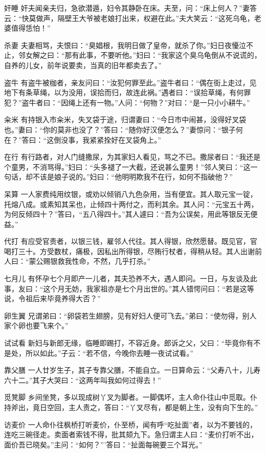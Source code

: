 \documentclass[12pt,UTF8]{ctexbook}
\begin{document}
奸睡
奸夫闻亲夫归，急欲潜遁，妇令其静卧在床。夫至，问：“床上何人？”妻答云：“快莫做声，隔壁王大爷被老娘打出来，权避在此。”夫大笑云：“这死乌龟，老婆值得恁怕！”

杀妻
夫妻相骂，夫恨曰：“臭娼根，我明日做了皇帝，就杀了你。”妇日夜懮泣不止，邻女解之曰：“那有此事，不要听他。”妇曰：“我家这个臭乌龟倒从不说谎的，自养的儿女，前年说要卖，当真的旧年都卖去了。”

盗牛
有盗牛被枷者，亲友问曰：“汝犯何罪至此。”盗牛者曰：“偶在街上走过，见地下有条草绳，以为没用，误拾而归，故连此祸。”遇者曰：“误拾草绳，有何罪犯？”盗牛者曰：“因绳上还有一物。”人问：“何物？”对曰：“是一只小小耕牛。”

籴米
有持银入市籴米，失叉袋于途，归谓妻曰：“今日市中闹甚，没得好叉袋也。”妻曰：“你的莫非也没了？”答曰：“随你好汉便怎么？”妻惊问：“银子何在？”答曰：“这倒没事，我紧紧拴好在叉袋角上。”

在行
有行路者，对人门缝撒尿，为其家妇人看见，骂之不已。撒尿者曰：“我还是个童男，不消骂得。”妇曰：“头多褪了一大截，还说甚么童男！”邻人笑曰：“这一句话，却不该是娘子说的。”妇曰：“他明明欺我不在行，如何不指破他？”

呆算
一人家费纯用纹银，或劝以倾销八九色杂用，当有便宜。其人取元宝一锭，托熔八成。或素知其呆也，止倾四十两付之，而利其余。其人问：“元宝五十两，为何反倾四十？”答曰，“五八得四十。”其人遽曰：“吾为公误矣，用此等银反无便益。”

代打
有应受官责者，以银三钱，雇邻人代往。其人得银，欣然愿替。既见官，官喝打三十。方受数杖，痛极，因私出所得银，尽贿行杖者，得稍从轻。其人出谢前人曰：“蒙公赐银救我性命，不然，几乎打杀。”

七月儿
有怀孕七个月即产一儿者，其夫恐养不大，遇人即问。一日，与友谈及此事，友曰：“这个月无妨，我家祖亦是七个月出世的。”其人错愕问曰：“若是这等说，令祖后来毕竟养得大否？”

卵生翼
兄谓弟曰：“卵袋若生翅膀，见有好妇人便可飞去。”弟曰：“使勿得，别人家个卵也要飞来个。”

试试看
新妇与新郎无缘，临睡即踢打，不容近身。郎诉之父，父曰：“毕竟你有不是处，所以如此。”子云：“若不信，今晚你去睡一夜试试看。”

靠父膳
一人廿岁生子，其子专靠父膳，不能自立。一日算命云：“父寿八十，儿寿六十二。”其子大哭曰：“这两年叫我如何过得去！”

觅凳脚
乡间坐凳，多以现成树丫叉为脚者。一脚偶坏，主人命仆往山中觅取。仆持斧出，竟日空回，主人责之，答曰：“丫叉尽有，都是朝上生，没有向下生的。”

访麦价
一人命仆往枫桥打听麦价，仆至桥，闻有呼“吃扯面”者，以为不要钱的，连吃三碗径走。卖面者索钱不得，批其颏九下。急归谓主人曰：“麦价打听不出，面价吾已晓矣。”主问：“如何？”’答曰：“扯面每碗要三个耳光。”
\end{document}
